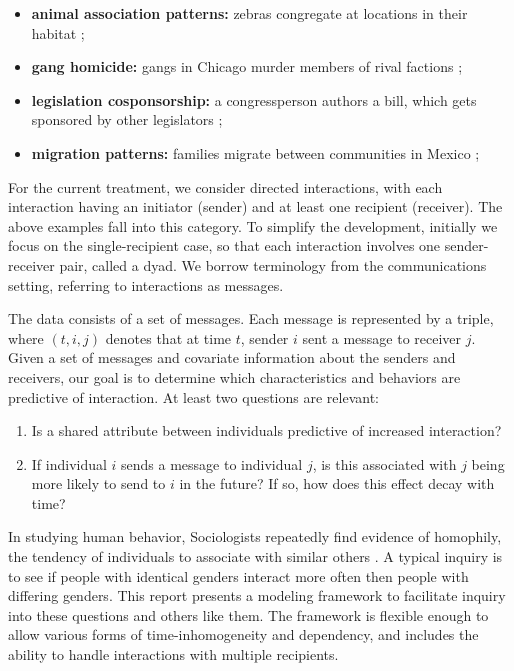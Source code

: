 \documentclass[aoas,preprint]{imsart}
\begin{document}
\begin{itemize}
    \item\textbf{animal association patterns:} zebras congregate at
    locations in their habitat \cite{sundaresan2007network};
    
    \item\textbf{gang homicide:} gangs in Chicago murder members of rival factions
    \cite{papachristos2009murder};

    \item\textbf{legislation cosponsorship:} a congressperson authors a bill, which
    gets sponsored by other legislators \cite{fowler2006connecting};

    \item\textbf{migration patterns:} families migrate between communities in
    Mexico \cite{mckenzie2007network};
\end{itemize}

For the current treatment, we consider directed interactions, with each
interaction having an initiator (sender) and at least one recipient
(receiver).  The above examples fall into this category.  To simplify
the development, initially we focus on the single-recipient case, so that
each interaction involves one sender-receiver pair, called a dyad.  We
borrow terminology from the communications setting, referring to
interactions as messages.

The data consists of a set of messages.  Each message is represented by a triple,
where $(t,i,j)$ denotes that at time $t$, sender $i$ sent a message to
receiver $j$.  Given a set of messages and covariate information about the
senders and receivers, our goal is to determine which characteristics and
behaviors are predictive of interaction.  At least two questions are
relevant:

\begin{enumerate}
    \item Is a shared attribute between individuals predictive of increased
    interaction?

    \item If individual $i$ sends a message to individual $j$, is this
    associated with $j$ being more likely to send to $i$ in the future?
    If so, how does this effect decay with time?
\end{enumerate}

In studying human behavior, Sociologists repeatedly find evidence of homophily,
the tendency of individuals to associate with similar others
\cite{mcpherson2001birds}. A typical inquiry is to see if people with identical
genders interact more often then people with differing genders.
This report presents a modeling framework to facilitate inquiry into
these questions and others like them. The framework is flexible enough to
allow various forms of time-inhomogeneity and dependency, and includes the
ability to handle interactions with multiple recipients. 
\end{document}
